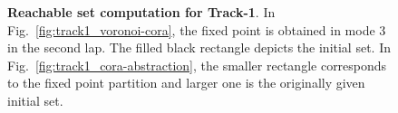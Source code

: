

\begin{figure}
    \centering
    \caption{\textbf{Reachable set computation for Track-1}. In Fig.~\ref{fig:track1_voronoi-cora}, the fixed point is obtained in mode 3 in the second lap. The filled black rectangle depicts the initial set. In Fig.~\ref{fig:track1_cora-abstraction}, the smaller rectangle corresponds to the fixed point partition and larger one is the originally given initial set.}
\label{fig:eval_track1}
\end{figure}

